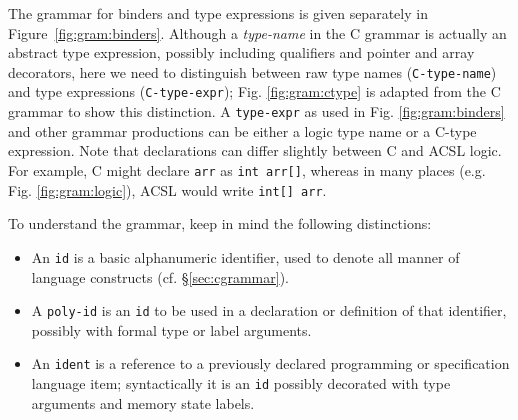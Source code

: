  The grammar
for binders and type expressions is given separately in
Figure~\ref{fig:gram:binders}.
Although a \textit{type-name} in the C grammar is actually an abstract type expression, possibly including qualifiers and pointer and array decorators,
here we need to distinguish between raw type names (\lstinline|C-type-name|) and type expressions (\lstinline|C-type-expr|); Fig. \ref{fig:gram:ctype} is adapted from the C grammar to show this distinction.
A \lstinline|type-expr| as used in Fig. \ref{fig:gram:binders} and other grammar productions can be
either a logic type name or a C-type expression.
Note that declarations can differ slightly between C and ACSL logic. For example, C might declare \lstinline|arr| as
\lstinline|int arr[]|, whereas in many places (e.g. Fig. \ref{fig:gram:logic}), ACSL would write \lstinline|int[] arr|.

To understand the grammar, keep in mind the following distinctions:
\begin{itemize}
\item An \lstinline|id| is a basic alphanumeric identifier, used to denote all manner of language constructs (cf. \S\ref{sec:cgrammar}).
\item A \lstinline|poly-id| is an \lstinline|id| to be used in a declaration or definition of that identifier, possibly with formal type or label arguments.
\item An \lstinline|ident| is a reference to a previously declared programming or specification language item; syntactically it is an \lstinline|id| possibly decorated with type arguments and memory state labels.
\end{itemize}

